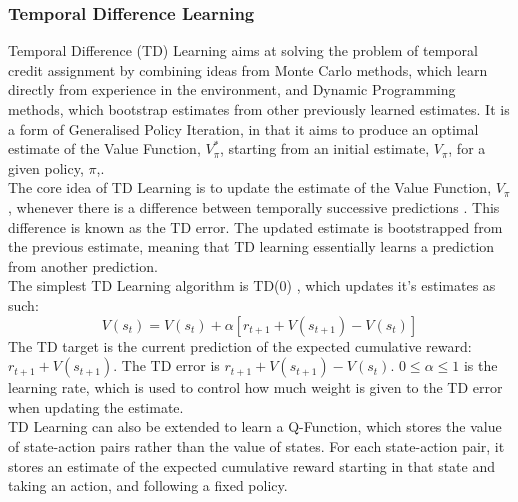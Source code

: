 \subsubsection{Temporal Difference Learning}
Temporal Difference (TD) Learning \cite{10.5555/911176, 5392560, 5391906} aims at solving the problem of temporal credit assignment by combining ideas from Monte Carlo methods, which learn directly from experience in the environment, and Dynamic Programming methods, which bootstrap estimates from other previously learned estimates. It is a form of Generalised Policy Iteration, in that it aims to produce an optimal estimate of the Value Function, $V_\pi^*$, starting from an initial estimate, $V_\pi$, for a given policy, $\pi$,\cite{Sutton1998}.
\\The core idea of TD Learning is to update the estimate of the Value Function, $V_\pi$, whenever there is a difference between temporally successive predictions \cite{Sutton:1988}. This difference is known as the TD error. The updated estimate is bootstrapped from the previous estimate, meaning that TD learning essentially learns a prediction from another prediction.
\\The simplest TD Learning algorithm is TD(0) \cite{Sutton:1988}, which updates it's estimates as such:
\begin{equation}
\label{eqn:td0update}
V(s_t) = V(s_t) + \alpha[r_{t+1} + V(s_{t+1}) - V(s_t)]
\end{equation}
The TD target is the current prediction of the expected cumulative reward: $r_{t+1} + V(s_{t+1})$. The TD error is $r_{t+1} + V(s_{t+1}) - V(s_t)$.
$0 \le \alpha \le 1$ is the learning rate, which is used to control how much weight is given to the TD error when updating the estimate. 
\\TD Learning can also be extended to learn a Q-Function, which stores the value of state-action pairs rather than the value of states. For each state-action pair, it stores an estimate of the expected cumulative reward starting in that state and taking an action, and following a fixed policy.


